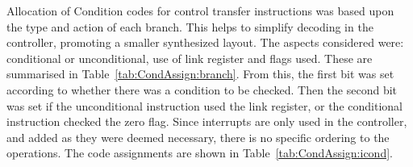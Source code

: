 Allocation of Condition codes for control transfer instructions was based upon the type and action of each branch. This helps to simplify decoding in the controller, promoting a smaller synthesized layout. 
The aspects considered were: conditional or unconditional, use of link register and flags used. 
These are summarised in Table~\ref{tab:CondAssign:branch}. 
From this, the first bit was set according to whether there was a condition to be checked. 
Then the second bit was set if the unconditional instruction used the link register, or the conditional instruction checked the zero flag. 
Since interrupts are only used in the controller, and added as they were deemed necessary, there is no specific ordering to the operations. 
The code assignments are shown in Table~\ref{tab:CondAssign:icond}. 

\begin{table}[h!]
\def\arraystretch{1.2}
\centering
\footnotesize
{}
\caption{Condition Code Assignments}
\label{tab:CondAssign}
\end{table}
